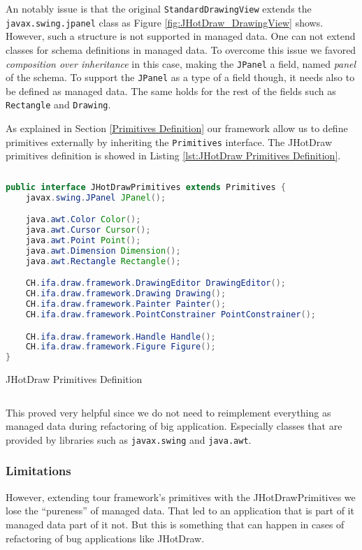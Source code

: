 An notably issue is that the original \texttt{StandardDrawingView} extends the \texttt{javax.swing.jpanel} class as Figure \ref{fig:JHotDraw_DrawingView} shows.
However, such a structure is not supported in managed data. 
One can not extend classes for schema definitions in managed data.
To overcome this issue we favored \textit{composition over inheritance} in this case, making the \texttt{JPanel} a field, named \textit{panel} of the schema.
To support the \texttt{JPanel} as a type of a field though, it needs also to be defined as managed data.
The same holds for the rest of the fields such as \texttt{Rectangle} and \texttt{Drawing}.

As explained in Section \ref{Primitives Definition} our framework allow us to define primitives externally by inheriting the \texttt{Primitives} interface.
The JHotDraw primitives definition is showed in Listing \ref{lst:JHotDraw Primitives Definition}.

\begin{sourcecode}[H]
	\begin{lstlisting}[language=Java, escapechar=|]
public interface JHotDrawPrimitives extends Primitives {
	javax.swing.JPanel JPanel();

	java.awt.Color Color();
	java.awt.Cursor Cursor();
	java.awt.Point Point();
	java.awt.Dimension Dimension();
	java.awt.Rectangle Rectangle();

	CH.ifa.draw.framework.DrawingEditor DrawingEditor();
	CH.ifa.draw.framework.Drawing Drawing();
	CH.ifa.draw.framework.Painter Painter();
	CH.ifa.draw.framework.PointConstrainer PointConstrainer();

	CH.ifa.draw.framework.Handle Handle();
	CH.ifa.draw.framework.Figure Figure();
}
	\end{lstlisting}
	\caption{JHotDraw Primitives Definition}
	\label{lst:JHotDraw Primitives Definition}
\end{sourcecode}

This proved very helpful since we do not need to reimplement everything as managed data during refactoring of big application. 
Especially classes that are provided by libraries such as \texttt{javax.swing} and \texttt{java.awt}.

\subsubsection{Limitations}
However, extending tour framework's primitives with the JHotDrawPrimitives we lose the ``pureness'' of managed data.
That led to an application that is part of it managed data part of it not.
But this is something that can happen in cases of refactoring of bug applications like JHotDraw.

